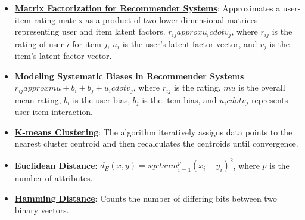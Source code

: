 \documentclass{article}%
\begin{document}
\begin{itemize}[leftmargin=*]
\item \href{https://purdue.brightspace.com/d2l/common/assets/pdfjs-d2l-dist/1.0.14-legacy/web/viewer.html?file=\%2Fcontent\%2Fenforced\%2F1095467-wl.202510.CS.24300.001\%2F11L2-svd-pca-recommender.pdf\%3Fou\%3D1095467\&lang=en-us\&container=d2l-fileviewer-rendered-pdf\&fullscreen=d2l-fileviewer-rendered-pdf-dialog\&height=667#page=36}{\textbf{Matrix Factorization for Recommender Systems}}: Approximates a user-item rating matrix as a product of two lower-dimensional matrices representing user and item latent factors. $r_{ij} approx u_i cdot v_j$, where $r_{ij}$ is the rating of user $i$ for item $j$, $u_i$ is the user's latent factor vector, and $v_j$ is the item's latent factor vector.%
\item \href{https://purdue.brightspace.com/d2l/common/assets/pdfjs-d2l-dist/1.0.14-legacy/web/viewer.html?file=\%2Fcontent\%2Fenforced\%2F1095467-wl.202510.CS.24300.001\%2F11L2-svd-pca-recommender.pdf\%3Fou\%3D1095467\&lang=en-us\&container=d2l-fileviewer-rendered-pdf\&fullscreen=d2l-fileviewer-rendered-pdf-dialog\&height=667#page=44}{\textbf{Modeling Systematic Biases in Recommender Systems}}: $r_{ij} approx mu + b_i + b_j + u_i cdot v_j$, where $r_{ij}$ is the rating, $mu$ is the overall mean rating, $b_i$ is the user bias, $b_j$ is the item bias, and $u_i cdot v_j$ represents user-item interaction.%
\item \href{https://purdue.brightspace.com/d2l/common/assets/pdfjs-d2l-dist/1.0.14-legacy/web/viewer.html?file=\%2Fcontent\%2Fenforced\%2F1095467-wl.202510.CS.24300.001\%2F12L2-distance-clusters.pdf\%3Fou\%3D1095467\&lang=en-us\&container=d2l-fileviewer-rendered-pdf\&fullscreen=d2l-fileviewer-rendered-pdf-dialog\&height=667#page=22}{\textbf{K-means Clustering}}: The algorithm iteratively assigns data points to the nearest cluster centroid and then recalculates the centroids until convergence.%
\item \href{https://purdue.brightspace.com/d2l/common/assets/pdfjs-d2l-dist/1.0.14-legacy/web/viewer.html?file=\%2Fcontent\%2Fenforced\%2F1095467-wl.202510.CS.24300.001\%2F12L2-distance-clusters.pdf\%3Fou\%3D1095467\&lang=en-us\&container=d2l-fileviewer-rendered-pdf\&fullscreen=d2l-fileviewer-rendered-pdf-dialog\&height=667#page=17}{\textbf{Euclidean Distance}}: $d_E(x, y) = sqrt{sum_{i=1}^{p} (x_i - y_i)^2}$, where $p$ is the number of attributes.%
\item \href{https://purdue.brightspace.com/d2l/common/assets/pdfjs-d2l-dist/1.0.14-legacy/web/viewer.html?file=\%2Fcontent\%2Fenforced\%2F1095467-wl.202510.CS.24300.001\%2F12L2-distance-clusters.pdf\%3Fou\%3D1095467\&lang=en-us\&container=d2l-fileviewer-rendered-pdf\&fullscreen=d2l-fileviewer-rendered-pdf-dialog\&height=667#page=19}{\textbf{Hamming Distance}}: Counts the number of differing bits between two binary vectors.%

\end{itemize}
\end{document}
